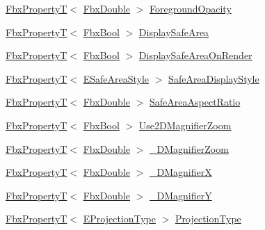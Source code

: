 \begin{DoxyCompactItemize}
\item 
\hyperlink{class_fbx_property_t}{Fbx\+PropertyT}$<$ \hyperlink{fbxtypes_8h_a171e72a1c46fc15c1a6c9c31948c1c5b}{Fbx\+Double} $>$ \hyperlink{class_fbx_camera_a95fe1a3dbd71e2503e7f4de5f14ea171}{Foreground\+Opacity}
\item 
\hyperlink{class_fbx_property_t}{Fbx\+PropertyT}$<$ \hyperlink{fbxtypes_8h_a92e0562b2fe33e76a242f498b362262e}{Fbx\+Bool} $>$ \hyperlink{class_fbx_camera_a61d982bee729eae989b1c4f49e53ef59}{Display\+Safe\+Area}
\item 
\hyperlink{class_fbx_property_t}{Fbx\+PropertyT}$<$ \hyperlink{fbxtypes_8h_a92e0562b2fe33e76a242f498b362262e}{Fbx\+Bool} $>$ \hyperlink{class_fbx_camera_a6fba1dac4e237b8fb5423c6e8fdb7586}{Display\+Safe\+Area\+On\+Render}
\item 
\hyperlink{class_fbx_property_t}{Fbx\+PropertyT}$<$ \hyperlink{class_fbx_camera_aa9fb36da95d392ac56ff2d8b44171210}{E\+Safe\+Area\+Style} $>$ \hyperlink{class_fbx_camera_a48f27fb4b475f1ee7d2ace77cc860ad3}{Safe\+Area\+Display\+Style}
\item 
\hyperlink{class_fbx_property_t}{Fbx\+PropertyT}$<$ \hyperlink{fbxtypes_8h_a171e72a1c46fc15c1a6c9c31948c1c5b}{Fbx\+Double} $>$ \hyperlink{class_fbx_camera_aeb22ecb7b5a1551e735e9cf222d79b6d}{Safe\+Area\+Aspect\+Ratio}
\item 
\hyperlink{class_fbx_property_t}{Fbx\+PropertyT}$<$ \hyperlink{fbxtypes_8h_a92e0562b2fe33e76a242f498b362262e}{Fbx\+Bool} $>$ \hyperlink{class_fbx_camera_ad1e40e5371ba4003e8b21cfe0b8b42c7}{Use2\+D\+Magnifier\+Zoom}
\item 
\hyperlink{class_fbx_property_t}{Fbx\+PropertyT}$<$ \hyperlink{fbxtypes_8h_a171e72a1c46fc15c1a6c9c31948c1c5b}{Fbx\+Double} $>$ \hyperlink{class_fbx_camera_ab60ab197ebbbf565d18dc7f7b2113f59}{\+\_\+D\+Magnifier\+Zoom}
\item 
\hyperlink{class_fbx_property_t}{Fbx\+PropertyT}$<$ \hyperlink{fbxtypes_8h_a171e72a1c46fc15c1a6c9c31948c1c5b}{Fbx\+Double} $>$ \hyperlink{class_fbx_camera_a0f5b732aa294c182fe6ac07ae70024fc}{\+\_\+D\+MagnifierX}
\item 
\hyperlink{class_fbx_property_t}{Fbx\+PropertyT}$<$ \hyperlink{fbxtypes_8h_a171e72a1c46fc15c1a6c9c31948c1c5b}{Fbx\+Double} $>$ \hyperlink{class_fbx_camera_a162fa10866f3c4cf3c5a87ed64aef21e}{\+\_\+D\+MagnifierY}
\item 
\hyperlink{class_fbx_property_t}{Fbx\+PropertyT}$<$ \hyperlink{class_fbx_camera_a717b9b0d28c8b20c115edf8c80016fb1}{E\+Projection\+Type} $>$ \hyperlink{class_fbx_camera_a36af73c36f749f694ccc9eefbe88087b}{Projection\+Type}

\end{DoxyCompactItemize}
